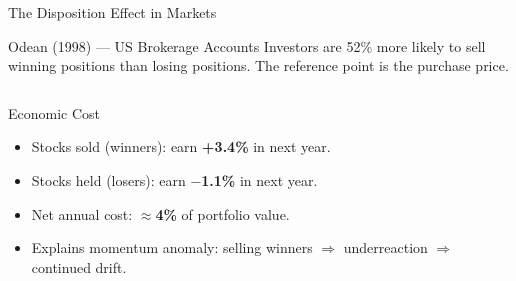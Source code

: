 \documentclass[aspectratio=169]{beamer}
\begin{document}
\begin{frame}{The Disposition Effect in Markets}
\begin{block}{Odean (1998) --- US Brokerage Accounts}
Investors are 52\% more likely to sell winning positions than losing positions. The reference point is the purchase price.
\end{block}
\begin{columns}
\begin{alertblock}{Economic Cost}
\begin{itemize}\small\setlength{\itemsep}{0pt}
  \item Stocks sold (winners): earn \textbf{+3.4\%} in next year.
  \item Stocks held (losers): earn \textbf{$-$1.1\%} in next year.
  \item Net annual cost: \textbf{$\approx$4\%} of portfolio value.
  \item Explains momentum anomaly: selling winners $\Rightarrow$ underreaction $\Rightarrow$ continued drift.
\end{itemize}
\end{alertblock}
\end{columns}
\end{frame}
\end{document}
